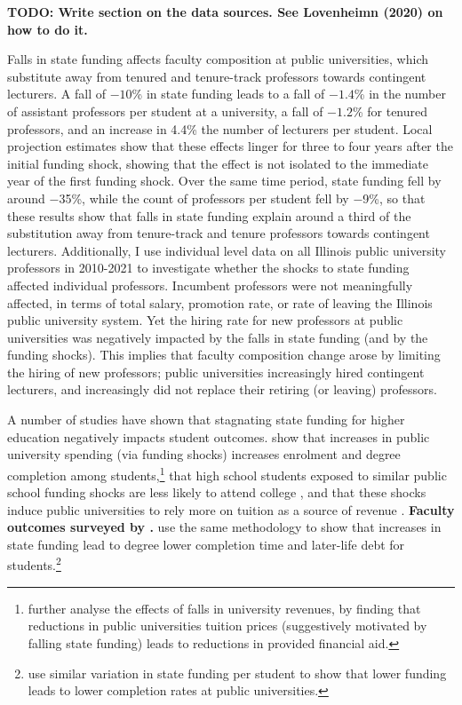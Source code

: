 \textbf{TODO: Write section on the data sources.  See Lovenheimn (2020) on how to do it.}

Falls in state funding affects faculty composition at public universities, which substitute away from tenured and tenure-track professors towards contingent lecturers.
A fall of $-10$\% in state funding leads to a fall of $-1.4$\% in the number of assistant professors per student at a university, a fall of $-1.2$\% for tenured professors, and an increase in 4.4\% the number of lecturers per student.
Local projection estimates show that these effects linger for three to four years after the initial funding shock, showing that the effect is not isolated to the immediate year of the first funding shock. 
Over the same time period, state funding fell by around $-$35\%, while the count of professors per student fell by $-$9\%, so that these results show that falls in state funding explain around a third of the substitution away from tenure-track and tenure professors towards contingent lecturers.
Additionally, I use individual level data on all Illinois public university professors in 2010-2021 to investigate whether the shocks to state funding affected individual professors.
Incumbent professors were not meaningfully affected, in terms of total salary, promotion rate, or rate of leaving the Illinois public university system.
Yet the hiring rate for new professors at public universities was negatively impacted by the falls in state funding (and by the funding shocks).
This implies that faculty composition change arose by limiting the hiring of new professors; public universities increasingly hired contingent lecturers, and increasingly did not replace their retiring (or leaving) professors.

A number of studies have shown that stagnating state funding for higher education negatively impacts student outcomes.
\cite{NBERw23736} show that increases in public university spending (via funding shocks) increases enrolment and degree completion among students,\footnote{
    \cite{miller2022making} further analyse the effects of falls in university revenues, by finding that reductions in public universities tuition prices (suggestively motivated by falling state funding) leads to reductions in provided financial aid.
}
that high school students exposed to similar public school funding shocks are less likely to attend college \citep{jackson2021school}, and that these shocks induce public universities to rely more on tuition as a source of revenue \citep{bound2019public}.
\textbf{Faculty outcomes surveyed by \cite{ehrenberg2003studying}.}
\cite{NBERw27885} use the same methodology to show that increases in state funding lead to degree lower completion time and later-life debt for students.\footnote{
    \cite{bound2007cohort} use similar variation in state funding per student to show that lower funding leads to lower completion rates at public universities.
}

